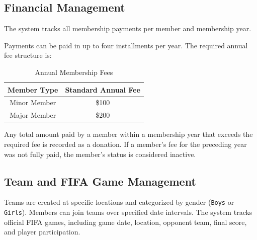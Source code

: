 \documentclass[11pt,a4paper]{article}
\begin{document}
\subsection{Financial Management}


The system tracks all membership payments per member and membership year.


Payments can be paid in up to four installments per year. The required annual fee structure is:


\begin{table}[H]

\centering


\begin{tabular}{cc}


\toprule

Member Type & Standard Annual Fee \\


\midrule


Minor Member & \$100 \\


Major Member & \$200 \\


\bottomrule


\end{tabular}


\caption{Annual Membership Fees}


\end{table}



Any total amount paid by a member within a membership year that exceeds the required fee is recorded as a donation. If a member's fee for the preceding year was not fully paid, the member's status is considered inactive.



\subsection{Team and FIFA Game Management}


Teams are created at specific locations and categorized by gender (\texttt{Boys} or \texttt{Girls}).
Members can join teams over specified date intervals. The system tracks official FIFA games,
including game date, location, opponent team, final score, and player participation.





\end{document}
